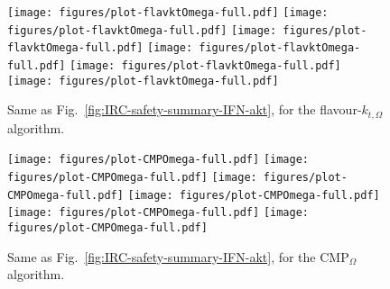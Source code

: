 \documentclass[nofootinbib,twocolumn,preprintnumbers,superscriptaddress,aps]{revtex4-2}
\begin{document}
\begin{figure*}
  \centering
  \texttt{[image: figures/plot-flavktOmega-full.pdf]}
  \texttt{[image: figures/plot-flavktOmega-full.pdf]}
  \texttt{[image: figures/plot-flavktOmega-full.pdf]}
  \texttt{[image: figures/plot-flavktOmega-full.pdf]}
  \texttt{[image: figures/plot-flavktOmega-full.pdf]}
  \texttt{[image: figures/plot-flavktOmega-full.pdf]}
  \\
  \caption{Same as Fig.~\ref{fig:IRC-safety-summary-IFN-akt}, for the
    flavour-$k_{t,\Omega}$ algorithm.
  }
  \label{fig:IRC-safety-summary-FlavKtOmega}
\end{figure*}

\begin{figure*}
  \centering
  \texttt{[image: figures/plot-CMPOmega-full.pdf]}
  \texttt{[image: figures/plot-CMPOmega-full.pdf]}
  \texttt{[image: figures/plot-CMPOmega-full.pdf]}
  \texttt{[image: figures/plot-CMPOmega-full.pdf]}
  \texttt{[image: figures/plot-CMPOmega-full.pdf]}
  \texttt{[image: figures/plot-CMPOmega-full.pdf]}
  \\
  \caption{Same as Fig.~\ref{fig:IRC-safety-summary-IFN-akt}, for the
    CMP$_{\Omega}$ algorithm.
  }
  \label{fig:IRC-safety-summary-CMPOmega}
\end{figure*}


\clearpage




%
\end{document}
